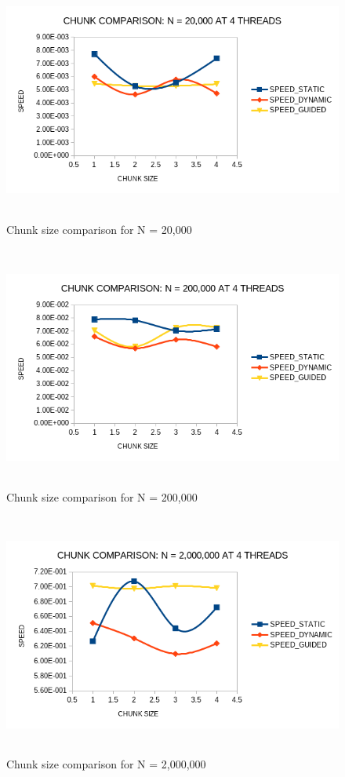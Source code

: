 \documentclass[12pt]{article}
\begin{document}
        \begin{figure}[H]
            \hfill\includegraphics[width=150mm,height= 80mm]{chunk_2e4.png}\hspace*{\fill}
            \caption{Chunk size comparison for N = 20,000}
        \end{figure}  

        \begin{figure}[H]
            \hfill\includegraphics[width=150mm,height= 80mm]{chunk_2e5.png}\hspace*{\fill}
            \caption{Chunk size comparison for N = 200,000}
        \end{figure}  

        \begin{figure}[H]
            \hfill\includegraphics[width=150mm,height= 80mm]{chunk_2e6.png}\hspace*{\fill}
            \caption{Chunk size comparison for N = 2,000,000}
        \end{figure}
\end{document}
